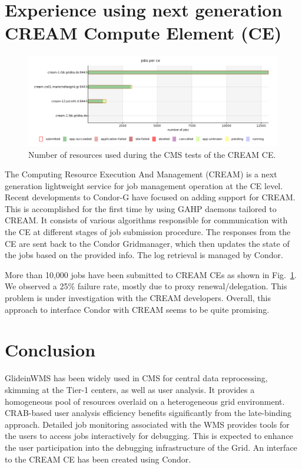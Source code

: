 \documentclass[a4paper]{jpconf}
\begin{document}
\section{Experience using next generation CREAM Compute Element (CE)}
\begin{figure}
\begin{center}
\includegraphics[scale=0.45]{cms_cream}
\end{center}
\caption{Number of resources used during the CMS tests of the CREAM CE.}
\label{fig:cms_cream}
\end{figure}
The Computing Resource Execution And Management (CREAM) is a next generation lightweight service 
for job management operation at the CE level. Recent developments to Condor-G have focused on adding 
support for CREAM. This is accomplished for the first time by using GAHP daemons tailored to CREAM.
It consists of various algorithms responsible for communication with the CE at different stages of job submission
procedure. The responses from the CE are sent back to the Condor Gridmanager, which then updates 
the state of the jobs based on the provided info. The log retrieval is managed by Condor.

More than 10,000 jobs have been submitted to CREAM CEs as shown in Fig.~\ref{fig:cms_cream}. We observed a 25\% failure 
rate, mostly due to proxy renewal/delegation. This problem is under investigation with the CREAM developers. 
Overall, this approach to interface Condor with CREAM seems to be quite promising.
\section{Conclusion}
GlideinWMS has been widely used in CMS for central data reprocessing, skimming at the Tier-1 centers, as well
as user analysis. It provides a homogeneous pool of resources overlaid on a heterogeneous grid environment. 
CRAB-based user analysis efficiency benefits significantly from the late-binding approach. Detailed job monitoring 
associated with the WMS provides tools for the users to access 
jobs interactively for debugging. This is expected to enhance the user participation into the debugging 
infrastructure of the Grid. An interface to the CREAM CE has been created using Condor.  
\end{document}
